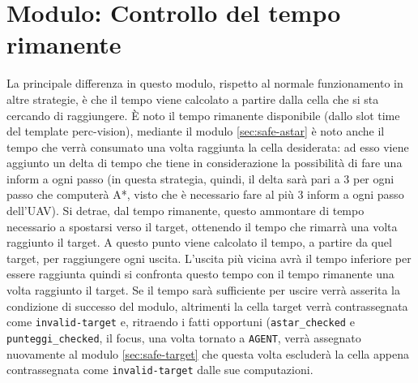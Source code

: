 \section{Modulo: Controllo del tempo rimanente} \label{sec:safe-tempo}
La principale differenza in questo modulo, rispetto al normale funzionamento in altre strategie, è che il tempo viene calcolato a partire dalla cella che si sta cercando di raggiungere. È noto il tempo rimanente disponibile (dallo slot time del template perc-vision), mediante il modulo \ref{sec:safe-astar} è noto anche il tempo che verrà consumato una volta raggiunta la cella desiderata: ad esso viene aggiunto un delta di tempo che tiene in considerazione la possibilità di fare una inform a ogni passo (in questa strategia, quindi, il delta sarà pari a 3 per ogni passo che computerà A*, visto che è necessario fare al più 3 inform a ogni passo dell'UAV). Si detrae, dal tempo rimanente, questo ammontare di tempo necessario a spostarsi verso il target, ottenendo il tempo che rimarrà una volta raggiunto il target. A questo punto viene calcolato il tempo, a partire da quel target, per raggiungere ogni uscita. L'uscita più vicina avrà il tempo inferiore per essere raggiunta quindi si confronta questo tempo con il tempo rimanente una volta raggiunto il target. Se il tempo sarà sufficiente per uscire verrà asserita la condizione di successo del modulo, altrimenti la cella target verrà contrassegnata come \texttt{invalid-target} e, ritraendo i fatti opportuni (\texttt{astar\_checked} e \texttt{punteggi\_checked}, il focus, una volta tornato a \texttt{AGENT}, verrà assegnato nuovamente al modulo \ref{sec:safe-target} che questa volta escluderà la cella appena contrassegnata come \texttt{invalid-target} dalle sue computazioni.

